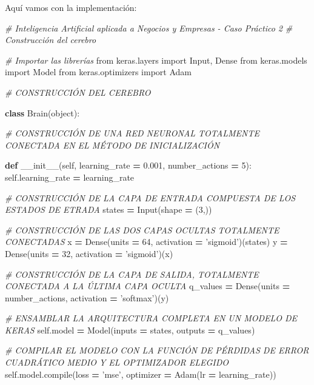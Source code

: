 \documentclass[]{book}
\newenvironment{Shaded}{\begin{snugshade}}{\end{snugshade}}
\newcommand{\BuiltInTok}[1]{#1}
\newcommand{\CommentTok}[1]{\textcolor[rgb]{0.56,0.35,0.01}{\textit{#1}}}
\newcommand{\DecValTok}[1]{\textcolor[rgb]{0.00,0.00,0.81}{#1}}
\newcommand{\FloatTok}[1]{\textcolor[rgb]{0.00,0.00,0.81}{#1}}
\newcommand{\FunctionTok}[1]{\textcolor[rgb]{0.00,0.00,0.00}{#1}}
\newcommand{\ImportTok}[1]{#1}
\newcommand{\KeywordTok}[1]{\textcolor[rgb]{0.13,0.29,0.53}{\textbf{#1}}}
\newcommand{\NormalTok}[1]{#1}
\newcommand{\OperatorTok}[1]{\textcolor[rgb]{0.81,0.36,0.00}{\textbf{#1}}}
\newcommand{\StringTok}[1]{\textcolor[rgb]{0.31,0.60,0.02}{#1}}
\newcommand{\VariableTok}[1]{\textcolor[rgb]{0.00,0.00,0.00}{#1}}
\begin{document}
Aquí vamos con la implementación:\\

\begin{Shaded}
\begin{Highlighting}[]
\CommentTok{# Inteligencia Artificial aplicada a Negocios y Empresas - Caso Práctico 2}
\CommentTok{# Construcción del cerebro}

\CommentTok{# Importar las librerías}
\ImportTok{from}\NormalTok{ keras.layers }\ImportTok{import}\NormalTok{ Input, Dense}
\ImportTok{from}\NormalTok{ keras.models }\ImportTok{import}\NormalTok{ Model}
\ImportTok{from}\NormalTok{ keras.optimizers }\ImportTok{import}\NormalTok{ Adam}

\CommentTok{# CONSTRUCCIÓN DEL CEREBRO}

\KeywordTok{class}\NormalTok{ Brain(}\BuiltInTok{object}\NormalTok{):}

    \CommentTok{# CONSTRUCCIÓN DE UNA RED NEURONAL TOTALMENTE CONECTADA EN EL MÉTODO DE INICIALIZACIÓN}

    \KeywordTok{def} \FunctionTok{__init__}\NormalTok{(}\VariableTok{self}\NormalTok{, learning_rate }\OperatorTok{=} \FloatTok{0.001}\NormalTok{, number_actions }\OperatorTok{=} \DecValTok{5}\NormalTok{):}
        \VariableTok{self}\NormalTok{.learning_rate }\OperatorTok{=}\NormalTok{ learning_rate}

        \CommentTok{# CONSTRUCCIÓN DE LA CAPA DE ENTRADA COMPUESTA DE LOS ESTADOS DE ETRADA}
\NormalTok{        states }\OperatorTok{=}\NormalTok{ Input(shape }\OperatorTok{=}\NormalTok{ (}\DecValTok{3}\NormalTok{,))}

        \CommentTok{# CONSTRUCCIÓN DE LAS DOS CAPAS OCULTAS TOTALMENTE CONECTADAS}
\NormalTok{        x }\OperatorTok{=}\NormalTok{ Dense(units }\OperatorTok{=} \DecValTok{64}\NormalTok{, activation }\OperatorTok{=} \StringTok{'sigmoid'}\NormalTok{)(states)}
\NormalTok{        y }\OperatorTok{=}\NormalTok{ Dense(units }\OperatorTok{=} \DecValTok{32}\NormalTok{, activation }\OperatorTok{=} \StringTok{'sigmoid'}\NormalTok{)(x)}

        \CommentTok{# CONSTRUCCIÓN DE LA CAPA DE SALIDA, TOTALMENTE CONECTADA A LA ÚLTIMA CAPA OCULTA}
\NormalTok{        q_values }\OperatorTok{=}\NormalTok{ Dense(units }\OperatorTok{=}\NormalTok{ number_actions, activation }\OperatorTok{=} \StringTok{'softmax'}\NormalTok{)(y)}

        \CommentTok{# ENSAMBLAR LA ARQUITECTURA COMPLETA EN UN MODELO DE KERAS}
        \VariableTok{self}\NormalTok{.model }\OperatorTok{=}\NormalTok{ Model(inputs }\OperatorTok{=}\NormalTok{ states, outputs }\OperatorTok{=}\NormalTok{ q_values)}

        \CommentTok{# COMPILAR EL MODELO CON LA FUNCIÓN DE PÉRDIDAS DE ERROR CUADRÁTICO MEDIO Y EL OPTIMIZADOR ELEGIDO}
        \VariableTok{self}\NormalTok{.model.}\BuiltInTok{compile}\NormalTok{(loss }\OperatorTok{=} \StringTok{'mse'}\NormalTok{, optimizer }\OperatorTok{=}\NormalTok{ Adam(lr }\OperatorTok{=}\NormalTok{ learning_rate))}
\end{Highlighting}
\end{Shaded}
\end{document}
